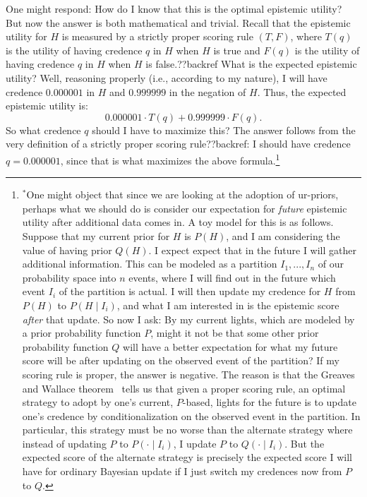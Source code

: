 One might respond: How do I know that this is the optimal epistemic utility? But now the answer is both 
mathematical and trivial. Recall that the epistemic utility for
$H$ is measured by a strictly proper scoring rule $(T,F)$, where $T(q)$ is the utility of having credence 
$q$ in $H$ when $H$ is true and $F(q)$ is the utility of having credence $q$ in $H$ when $H$ is false.??backref
What is the expected epistemic utility? Well, reasoning properly (i.e., according to my nature), I will have
credence $0.000001$  in $H$ and $0.999999$ in the negation of $H$. Thus, the expected
epistemic utility is:
$$
	0.000001 \cdot T(q) + 0.999999\cdot F(q).
$$
So what credence $q$ should I have to maximize this? The answer follows from the very definition of a 
strictly proper scoring rule??backref: I should have credence $q=0.000001$, since that is what maximizes
the above formula.\footnote{$^*$One might object that since we are looking at
the adoption of ur-priors, perhaps what we should do is consider our expectation for \textit{future} epistemic 
utility after additional data comes in. A toy model for this is as follows. Suppose that my current prior for
$H$ is $P(H)$, and I am considering the value of having prior $Q(H)$. I expect expect that in the future I will 
gather additional information. This can be modeled as a partition $I_1,...,I_n$ of our probability space
into $n$ events, where I will find out in the future which event $I_i$ of the partition is actual. I will then
update my credence for $H$ from $P(H)$ to $P(H\mid I_i)$, and what I am interested in is the epistemic score
\textit{after} that update. So now I ask: By my current lights, which are modeled by a prior probability
function $P$, might it not be that some other prior probability function $Q$ will have a better expectation
for what my future score will be after updating on the observed event of the partition? If my scoring rule
is proper, the answer is negative. The reason is that the Greaves and Wallace theorem~\parencite{GreavesWallace}
tells us that given a proper scoring rule, an optimal strategy to adopt by one's current, $P$-based, lights for 
the future is to update one's credence by conditionalization on the observed event in the partition. In particular,
this strategy must be no worse than the alternate strategy where instead of updating $P$ to $P(\cdot \mid I_i)$, I 
update $P$ to $Q(\cdot \mid I_i)$. But the expected score of the alternate strategy is precisely the expected
score I will have for ordinary Bayesian update if I just switch my credences now from $P$ to $Q$.}

